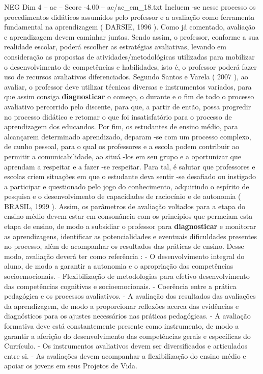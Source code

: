 \begin{textsample}{NEG Dim 4 – ac – Score -4.00 – ac/ac\_em\_18.txt}
Incluem -se nesse processo os procedimentos didáticos assumidos pelo professor e a avaliação como ferramenta fundamental na aprendizagem ( DARSIE, 1996 ).
Como já comentado, avaliação e aprendizagem devem caminhar juntas.
Sendo assim, o professor, conforme a sua realidade escolar, poderá escolher as estratégias avaliativas, levando em consideração as propostas de atividades/metodológicas utilizadas para mobilizar o desenvolvimento de competências e habilidades, isto é, o professor poderá fazer uso de recursos avaliativos diferenciados.
Segundo Santos e Varela ( 2007 ), ao avaliar, o professor deve utilizar técnicas diversas e instrumentos variados, para que assim consiga \textbf{diagnosticar} o começo, o durante e o fim de todo o processo avaliativo percorrido pelo discente, para que, a partir de então, possa progredir no processo didático e retomar o que foi insatisfatório para o processo de aprendizagem dos educandos.
Por fim, os estudantes de ensino médio, para alcançarem determinado aprendizado, deparam -se com um processo complexo, de cunho pessoal, para o qual os professores e a escola podem contribuir ao permitir a comunicabilidade, ao situá -los em seu grupo e a oportunizar que aprendam a respeitar e a fazer -se respeitar.
Para tal, é salutar que professores e escolas criem situações em que o estudante deva sentir -se desafiado ou instigado a participar e questionado pelo jogo do conhecimento, adquirindo o espírito de pesquisa e o desenvolvimento de capacidades de raciocínio e de autonomia ( BRASIL, 1999 ).
Assim, os parâmetros de avaliação voltados para a etapa do ensino médio devem estar em consonância com os princípios que permeiam esta etapa de ensino, de modo a subsidiar o professor para \textbf{diagnosticar} e monitorar as aprendizagens, identificar as potencialidades e eventuais dificuldades presentes no processo, além de acompanhar os resultados das práticas de ensino.
Desse modo, avaliação deverá ter como referência : - O desenvolvimento integral do aluno, de modo a garantir a autonomia e o apropriação das competências socioemocionais. - Flexibilização de metodologias para efetivo desenvolvimento das competências cognitivas e socioemocionais. - Coerência entre a prática pedagógica e os processos avaliativos. - A avaliação dos resultados das avaliações da aprendizagem, de modo a proporcionar reflexões acerca das evidências e diagnósticos para os ajustes necessários nas práticas pedagógicas. - A avaliação formativa deve está constantemente presente como instrumento, de modo a garantir a aferição do desenvolvimento das competências gerais e específicas do Currículo. - Os instrumentos avaliativos devem ser diversificados e articulados entre si. - As avaliações devem acompanhar a flexibilização do ensino médio e apoiar os jovens em seus Projetos de Vida.

\end{textsample}
